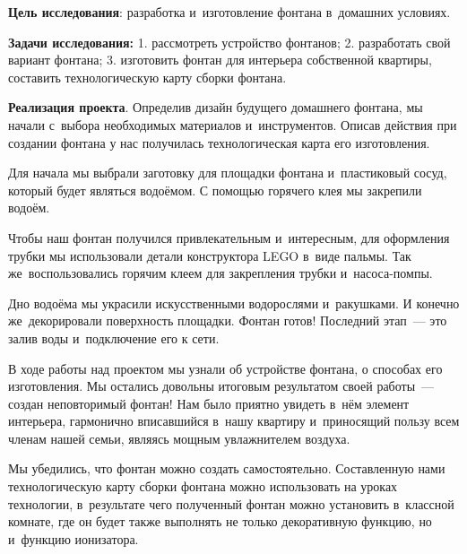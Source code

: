 


\makeProcTitleSchool


\textbf{Цель исследования}: разработка и~изготовление фонтана в~домашних условиях.

\textbf{Задачи исследования:} 1. рассмотреть устройство фонтанов; 2. разработать свой вариант фонтана; 3. изготовить фонтан для интерьера собственной квартиры, составить технологическую карту сборки фонтана.

\textbf{Реализация проекта}. Определив дизайн будущего домашнего фонтана, мы начали с~выбора необходимых материалов и~инструментов. Описав действия при создании фонтана у нас получилась технологическая карта его изготовления.

Для начала мы выбрали заготовку для площадки фонтана и~пластиковый сосуд, который будет являться водоёмом. С помощью горячего клея мы закрепили водоём.

Чтобы наш фонтан получился привлекательным и~интересным, для оформления трубки мы использовали детали конструктора LEGO в~виде пальмы. Так же~воспользовались горячим клеем для закрепления трубки и~насоса-помпы.

Дно водоёма мы украсили искусственными водорослями и~ракушками. И конечно же~декорировали поверхность площадки.
Фонтан готов! Последний этап~--- это залив воды и~подключение его к сети.

В ходе работы над проектом мы узнали об устройстве фонтана, о способах его изготовления. Мы остались довольны итоговым результатом своей работы~--- создан неповторимый фонтан! Нам было приятно увидеть в~нём элемент интерьера, гармонично вписавшийся в~нашу квартиру и~приносящий пользу всем членам нашей семьи, являясь мощным увлажнителем воздуха.

Мы убедились, что фонтан можно создать самостоятельно. Составленную нами технологическую карту сборки фонтана можно использовать на уроках технологии, в~результате чего полученный фонтан можно установить в~классной комнате, где он будет также выполнять не только декоративную функцию, но и~функцию ионизатора.
